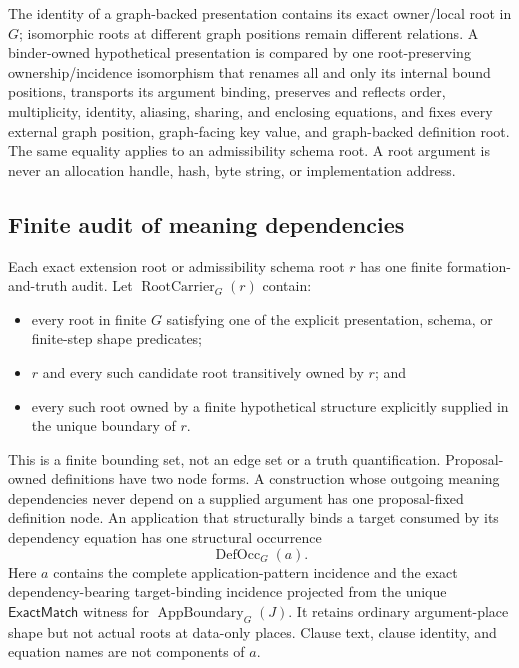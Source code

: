 \documentclass[11pt,twoside]{article}
\newcommand{\ExactMatch}{\mathsf{ExactMatch}}
\begin{document}
The identity of a graph-backed presentation contains its exact owner/local root in
\(G\); isomorphic roots at different graph positions remain different relations.
A binder-owned hypothetical presentation is compared by one root-preserving
ownership/incidence isomorphism that renames all and only its internal bound
positions, transports its argument binding, preserves and reflects order,
multiplicity, identity, aliasing, sharing, and enclosing equations, and fixes every
external graph position, graph-facing key value, and graph-backed definition root.
The same equality applies to an admissibility schema root.  A root argument is
never an allocation handle, hash, byte string, or implementation address.

\subsection{Finite audit of meaning dependencies}\label{sec:audit}

Each exact extension root or admissibility schema root \(r\) has one finite
formation-and-truth audit.  Let \(\operatorname{RootCarrier}_G(r)\) contain:

\begin{itemize}[leftmargin=2em]
  \item every root in finite \(G\) satisfying one of the explicit presentation,
        schema, or finite-step shape predicates;
  \item \(r\) and every such candidate root transitively owned by \(r\); and
  \item every such root owned by a finite hypothetical structure explicitly
        supplied in the unique boundary of \(r\).
\end{itemize}

This is a finite bounding set, not an edge set or a truth quantification.
Proposal-owned definitions have two node forms.  A construction whose outgoing
meaning dependencies never depend on a supplied argument has one proposal-fixed
definition node.  An application that structurally binds a target consumed by its
dependency equation has one structural occurrence
\[
  \operatorname{DefOcc}_G(a).
\]
Here \(a\) contains the complete application-pattern incidence and the exact
dependency-bearing target-binding incidence projected from the unique
\(\ExactMatch\) witness for
\(\operatorname{AppBoundary}_G(J)\).  It retains ordinary argument-place shape but
not actual roots at data-only places.  Clause text, clause identity, and equation
names are not components of \(a\).
\end{document}
